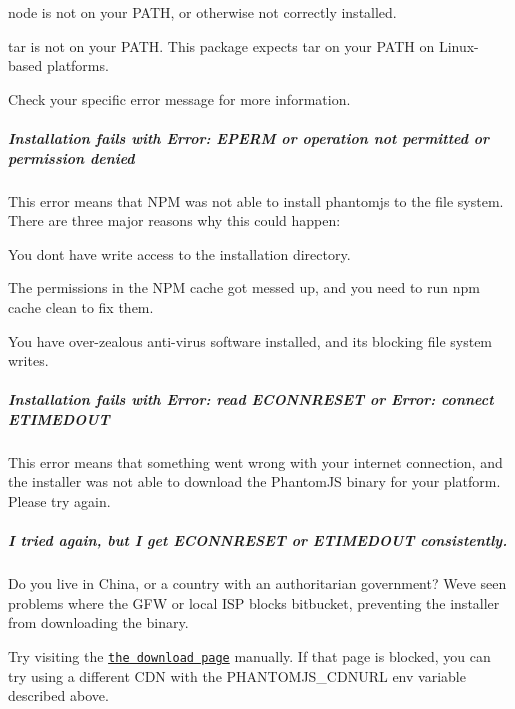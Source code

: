 \begin{DoxyItemize}
\item {\ttfamily node} is not on your P\+A\+T\+H, or otherwise not correctly installed.
\item {\ttfamily tar} is not on your P\+A\+T\+H. This package expects {\ttfamily tar} on your P\+A\+T\+H on Linux-\/based platforms.
\end{DoxyItemize}

Check your specific error message for more information.

\subparagraph*{Installation fails with {\ttfamily Error\+: E\+P\+E\+R\+M} or {\ttfamily operation not permitted} or {\ttfamily permission denied}}

This error means that N\+P\+M was not able to install phantomjs to the file system. There are three major reasons why this could happen\+:


\begin{DoxyItemize}
\item You don\textquotesingle{}t have write access to the installation directory.
\item The permissions in the N\+P\+M cache got messed up, and you need to run {\ttfamily npm cache clean} to fix them.
\item You have over-\/zealous anti-\/virus software installed, and it\textquotesingle{}s blocking file system writes.
\end{DoxyItemize}

\subparagraph*{Installation fails with {\ttfamily Error\+: read E\+C\+O\+N\+N\+R\+E\+S\+E\+T} or {\ttfamily Error\+: connect E\+T\+I\+M\+E\+D\+O\+U\+T}}

This error means that something went wrong with your internet connection, and the installer was not able to download the Phantom\+J\+S binary for your platform. Please try again.

\subparagraph*{I tried again, but I get {\ttfamily E\+C\+O\+N\+N\+R\+E\+S\+E\+T} or {\ttfamily E\+T\+I\+M\+E\+D\+O\+U\+T} consistently.}

Do you live in China, or a country with an authoritarian government? We\textquotesingle{}ve seen problems where the G\+F\+W or local I\+S\+P blocks bitbucket, preventing the installer from downloading the binary.

Try visiting the \href{http://cdn.bitbucket.org/ariya/phantomjs/downloads}{\tt the download page} manually. If that page is blocked, you can try using a different C\+D\+N with the {\ttfamily P\+H\+A\+N\+T\+O\+M\+J\+S\+\_\+\+C\+D\+N\+U\+R\+L} env variable described above.

